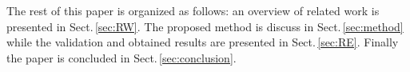 The rest of this paper is organized as follows: an overview of related work is presented in Sect.\,\ref{sec:RW}.
The proposed method is discuss in Sect.\,\ref{sec:method} while the validation and obtained results are presented in Sect.\,\ref{sec:RE}.
Finally the paper is concluded in Sect.\,\ref{sec:conclusion}.




